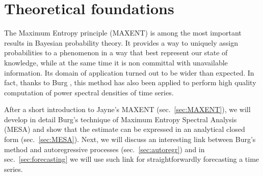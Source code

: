 \documentclass[twocolumn,showpacs,preprintnumbers,nofootinbib,prd,
superscriptaddress,10pt]{revtex4-1}
\begin{document}
\section{Theoretical foundations}
The Maximum Entropy principle (MAXENT) is among the most important results in Bayesian probability theory. It provides a way to uniquely assign probabilities to a phenomenon in a way that best represent our state of knowledge, while at the same time it is non committal with unavailable information. Its domain of application turned out to be wider than expected. In fact, thanks to Burg \cite{burg1975maximum}, this method has also been applied to perform high quality computation of power spectral densities of time series.

After a short introduction to Jayne's MAXENT (sec.~\ref{sec:MAXENT}), we will develop in detail Burg's technique of Maximum Entropy Spectral Analysis (MESA) and show that the estimate can be expressed in an analytical closed form (sec.~\ref{sec:MESA}).
Next, we will discuss an interesting link between Burg's method and autoregressive processes (sec.~\ref{sec:autoregr}) and in sec.~\ref{sec:forecasting} we will use such link for straightforwardly forecasting a time series.
\end{document}
